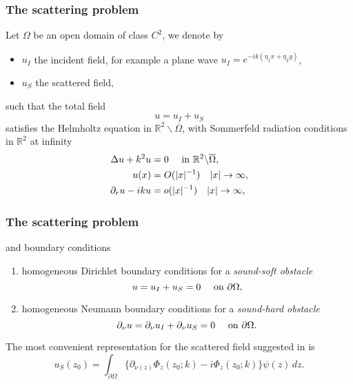 \documentclass[handout]{beamer}
\newcommand{\upin}{\textup{ in }}
\newcommand{\upon}{\textup{ on }}
\begin{document}
\begin{frame}
 \frametitle{The scattering problem}
 Let $\Omega$ be an open domain of class $C^2$, we denote by 
 \begin{itemize}[<+->]
  \item  $u_I$ the incident field, 
for example a plane wave $u_I = e^{-ik(\eta_1 x + \eta_2 y)}$,
  \item $u_S$ the scattered field,
 \end{itemize}
 \pause
 such that the
total field
\begin{equation}
 u=u_I + u_S\label{eq:def-total-fiels} 
\end{equation}
\pause
satisfies the Helmholtz equation in 
$\mathbb{R}^2\backslash\overline{\Omega}$, with Sommerfeld radiation 
conditions in $\mathbb{R}^2$ at infinity
\begin{align}
 \Delta u + k^2 u &= 0 \quad \upin \mathbb{R}^2\backslash\overline{\Omega},\\
 u(x)&=O(|x|^{-1}) \quad |x|\to \infty,\\
 \partial_r u - ik u &=o(|x|^{-1})\quad |x|\to \infty,   
\end{align}
\end{frame}
\begin{frame}
\frametitle{The scattering problem}
and boundary conditions
\begin{enumerate}
 \item homogeneous Dirichlet boundary conditions for a \emph{sound-soft obstacle}
 \begin{equation}
  u = u_I + u_S= 0\quad\upon \partial \Omega,
 \end{equation}
 \item homogeneous Neumann boundary conditions for a \emph{sound-hard obstacle}
 \begin{equation}
  \partial_\nu u = \partial_\nu u_I + \partial_\nu u_S= 0\quad\upon \partial \Omega.
 \end{equation}
\end{enumerate}
\pause
The most convenient representation for the scattered field suggested in \cite{chen-zhou:book} is
\begin{equation}
 u_S(z_0)=\int_{\partial \Omega}\Big\{\partial_{\nu(z)}\Phi_z(z_0;k) -i\Phi_z(z_0;k)\Big\}\psi(z)\,dz.
\end{equation}
\end{frame}
\end{document}
